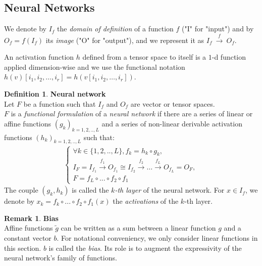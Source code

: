 \documentclass{article}
\theoremstyle{definition}
\newtheorem{definition}{Definition}[section]
\newtheorem{remark}{Remark}
\newcommand{\ovec}{}
\begin{document}
\subsection{Neural Networks}

We denote by $I_f$ the \textit{domain of definition} of a function $f$ ("I" for "input") and by $O_f = f(I_f)$ its \textit{image} ("O" for "output"), and we represent it as $I_f~\xrightarrow{f}~O_f$.

An activation function $h$ defined from a tensor space to itself is a $1$-d function applied dimension-wise and we use the functional notation $h(v)[i_1, i_2, \ldots, i_r] = h(v[i_1, i_2, \ldots, i_r])$.

\begin{definition}\textbf{Neural network}\\
\label{nndef}
{Let $F$ be a function such that $I_f$ and $O_f$ are vector or tensor spaces.\\
$F$ is a \emph{functional formulation} of a \emph{neural network} if there are a series of linear or affine functions $(g_k)_{k=1,2,..,L}$ and a series of non-linear derivable activation functions $(h_k)_{k=1,2,..,L}$ such that:
\begin{gather}
\left\{
  \begin{array}{l}
    \forall k \in \{1,2,..,L\}, f_k = h_k \circ g_k, \\
    I_F = I_{f_1} \xrightarrow{f_1} O_{f_1} \cong I_{f_2} \xrightarrow{f_2} \dots \xrightarrow{f_L} O_{f_L} = O_F, \\
    F = f_{L} \circ ... \circ f_{2} \circ f_1
  \end{array}
\right.
\end{gather}
The couple $(g_k, h_k)$ is called the \emph{$k$-th layer} of the neural network.
For $\ovec{x} \in I_f$, we denote by $\ovec{x_k} = f_k \circ ... \circ f_{2} \circ f_1 (\ovec{x})$ the \emph{activations} of the $k$-th layer.
}
\end{definition}

\begin{remark}\textbf{Bias}\\
Affine functions $\widetilde{g}$ can be written as a sum between a linear function $g$ and a constant vector $b$. For notational conveniency, we only consider linear functions in this section. $b$ is called the \emph{bias}. Its role is to augment the expressivity of the neural network's family of functions.
\end{remark}
\end{document}
